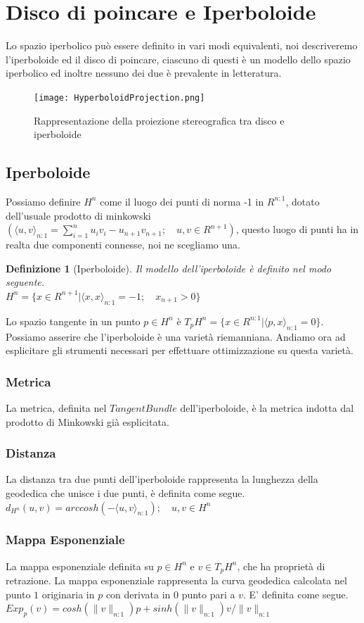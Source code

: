 \documentclass[a4paper, 12pt]{article}
\newtheorem{definition}{Definizione}
\begin{document}
\section{Disco di poincare e Iperboloide}
Lo spazio iperbolico può essere definito in vari modi equivalenti, noi descriveremo l'iperboloide ed il disco di poincare, ciascuno di questi è un modello dello spazio iperbolico ed inoltre nessuno dei due è prevalente in letteratura.\\
\begin{figure}[t] %
    \centering\texttt{[image: HyperboloidProjection.png]}
    \caption{Rappresentazione della proiezione stereografica tra disco e iperboloide}
\end{figure}
\subsection{Iperboloide}
Possiamo definire $H^n$ come il luogo dei punti di norma -1 in $R^{n:1}$, dotato dell'usuale prodotto di minkowski $(\langle u, v \rangle_{n:1} = \sum_{i=1}^{n} u_iv_i - u_{n+1}v_{n+1}; \quad u,v \in R^{n+1})$, questo luogo di punti ha in realta due componenti connesse, noi ne scegliamo una.
\begin{definition}[Iperboloide]
Il modello dell'iperboloide è definito nel modo seguente.\\
$H^n = \{x \in R^{n+1} | \langle x, x \rangle_{n:1} = -1; \quad x_{n+1} > 0 \}$
\end{definition}
Lo spazio tangente in un punto $p \in H^n$ è $T_pH^n = \{x \in R^{n:1} | \langle p,x \rangle_{n:1} = 0\}$.\\
Possiamo asserire che l'iperboloide è una varietà riemanniana. Andiamo ora ad esplicitare gli strumenti necessari per effettuare ottimizzazione su questa varietà.
\subsubsection{Metrica}
La metrica, definita nel $Tangent Bundle$ dell'iperboloide, è la metrica indotta dal prodotto di Minkowski già esplicitata.
\subsubsection{Distanza}
La distanza tra due punti dell'iperboloide rappresenta la lunghezza della geodedica che unisce i due punti, è definita come segue.\\
$d_{H^n} (u,v) = arccosh(-\langle u, v \rangle_{n:1}); \quad u,v \in H^n$
\subsubsection{Mappa Esponenziale}
La mappa esponenziale definita su $p \in H^n$ e $v \in T_pH^n$, che ha proprietà di retrazione. La mappa esponenziale rappresenta la curva geodedica calcolata nel punto $1$ originaria in $p$ con derivata in $0$ punto pari a $v$. E' definita come segue.\\
$Exp_p(v) = cosh(\parallel v \parallel_{n:1})p + sinh(\parallel v \parallel_{n:1}) v / \parallel v \parallel_{n:1}$
\end{document}
